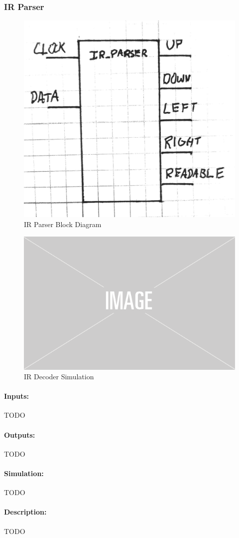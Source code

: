 \documentclass[]{article}
\begin{document}
\subsubsection{IR Parser}
\begin{figure}[H]\centering
    \includegraphics[width=0.5\linewidth]{figures/IR_Parser_Block.jpg}
    \caption{IR Parser Block Diagram}
    \label{fig:irParserBlock}
\end{figure}
\begin{figure}[H]\centering
    \includegraphics[width=0.5\linewidth]{figures/placeholder.png}
    \caption{IR Decoder Simulation}
    \label{fig:irParserSim}
\end{figure}
\paragraph{Inputs:} TODO
\paragraph{Outputs:} TODO
\paragraph{Simulation:} TODO
\paragraph{Description:} TODO
\end{document}
